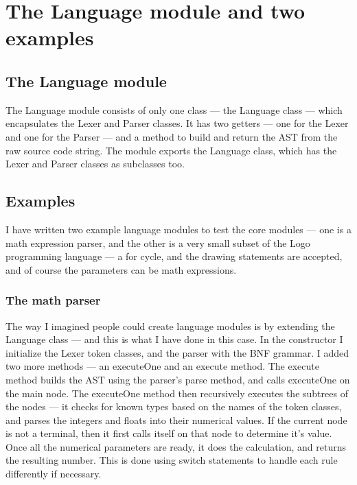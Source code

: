 \chapter{The Language module and two examples}
\section{The Language module}
The Language module consists of only one class --- the Language class --- which encapsulates the Lexer and Parser classes. It has two getters --- one for the Lexer and one for the Parser --- and a method to build and return the AST from the raw source code string.
The module exports the Language class, which has the Lexer and Parser classes as subclasses too.
\section{Examples}
I have written two example language modules to test the core modules --- one is a math expression parser, and the other is a very small subset of the Logo programming language --- a for cycle, and the drawing statements are accepted, and of course the parameters can be math expressions.
\subsection{The math parser}
The way I imagined people could create language modules is by extending the Language class --- and this is what I have done in this case. In the constructor I initialize the Lexer token classes, and the parser with the BNF grammar. I added two more methods --- an executeOne and an execute method. The execute method builds the AST using the parser's parse method, and calls executeOne on the main node. The executeOne method then recursively executes the subtrees of the nodes --- it checks for known types based on the names of the token classes, and parses the integers and floats into their numerical values. If the current node is not a terminal, then it first calls itself on that node to determine it's value. Once all the numerical parameters are ready, it does the calculation, and returns the resulting number. This is done using switch statements to handle each rule differently if necessary.

